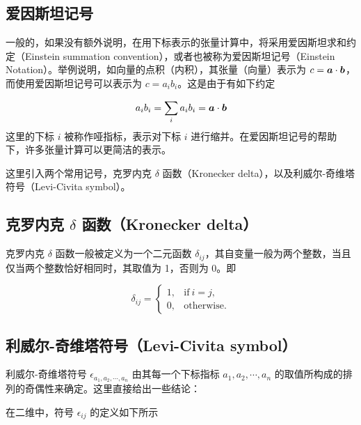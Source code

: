 \documentclass{article}
\begin{document}
\subsection{爱因斯坦记号}
一般的，如果没有额外说明，在用下标表示的张量计算中，将采用爱因斯坦求和约定（Einstein
summation convention），或者也被称为爱因斯坦记号（Einstein
Notation）。举例说明，如向量的点积（内积），其张量（向量）表示为
$c = {\bm a} \cdot {\bm b}$，而使用爱因斯坦记号可以表示为
$c = a_i b_i$。这是由于有如下约定

\[a_i b_i = \sum_i a_i b_i = {\bm a} \cdot {\bm b}\]
这里的下标 $i$ 被称作哑指标，表示对下标 $i$
进行缩并。在爱因斯坦记号的帮助下，许多张量计算可以更简洁的表示。

这里引入两个常用记号，克罗内克 $\delta$ 函数（Kronecker
delta），以及利威尔-奇维塔符号（Levi-Civita symbol）。


\subsection{克罗内克 $\delta$ 函数（Kronecker delta）}
克罗内克 $\delta$ 函数一般被定义为一个二元函数
$\delta_{ij}$，其自变量一般为两个整数，当且仅当两个整数恰好相同时，其取值为
1，否则为 0。即

\[\delta_{ij} = \begin{cases}
        1, & \text{if}\ i = j, \\
        0, & \text{otherwise.}
    \end{cases}\]


\subsection{利威尔-奇维塔符号（Levi-Civita symbol）}
利威尔-奇维塔符号 $\epsilon_{a_1, a_2, \cdots, a_n}$
由其每一个下标指标 $a_1, a_2, \cdots, a_n$
的取值所构成的排列的奇偶性来确定。这里直接给出一些结论：

在二维中，符号 $\epsilon_{ij}$ 的定义如下所示
\end{document}
